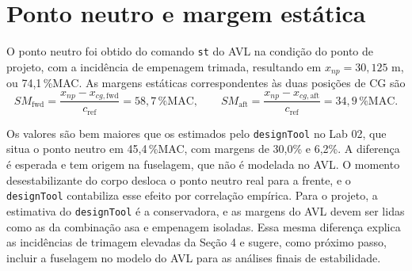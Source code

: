 \newpage
\section{Ponto neutro e margem estática}

O ponto neutro foi obtido do comando \texttt{st} do AVL na condição do
ponto de projeto, com a incidência de empenagem trimada, resultando em
$x_{np} = 30{,}125$ m, ou 74,1\,\%MAC. As margens estáticas
correspondentes às duas posições de CG são
\begin{equation*}
    SM_{\mathrm{fwd}} = \frac{x_{np} - x_{cg,\mathrm{fwd}}}{c_{\mathrm{ref}}}
    = 58{,}7\,\%\mathrm{MAC},
    \qquad
    SM_{\mathrm{aft}} = \frac{x_{np} - x_{cg,\mathrm{aft}}}{c_{\mathrm{ref}}}
    = 34{,}9\,\%\mathrm{MAC}.
\end{equation*}

Os valores são bem maiores que os estimados pelo \texttt{designTool} no
Lab 02, que situa o ponto neutro em 45,4\,\%MAC, com margens de 30,0\% e
6,2\%. A diferença é esperada e tem origem na fuselagem, que não é
modelada no AVL. O momento desestabilizante do corpo desloca o ponto
neutro real para a frente, e o \texttt{designTool} contabiliza esse efeito
por correlação empírica. Para o projeto, a estimativa do
\texttt{designTool} é a conservadora, e as margens do AVL devem ser lidas
como as da combinação asa e empenagem isoladas. Essa mesma diferença
explica as incidências de trimagem elevadas da Seção 4 e sugere, como
próximo passo, incluir a fuselagem no modelo do AVL para as análises
finais de estabilidade.
